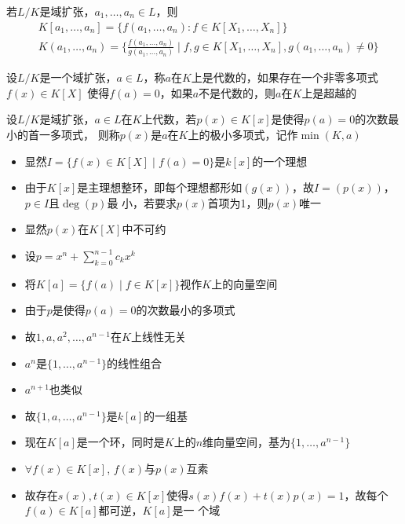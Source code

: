 \documentclass[11pt]{article}
\begin{document}
\begin{proposition}[]
若\(L/K\)是域扩张，\(a_1,\dots,a_n\in L\)，则
\begin{align*}
&K[a_1,\dots,a_n]=\{f(a_1,\dots,a_n):f\in K[X_1,\dots,X_n]\}\\
&K(a_1,\dots,a_n)=\{\frac{f(a_1,\dots,a_n)}{g(a_1,\dots,a_n)}\mid f,g\in K[X_1,\dots,X_n],g(a_1,\dots,a_n)\neq 0\}
\end{align*}
\end{proposition}

\begin{definition}[]
设\(L/K\)是一个域扩张，\(a\in L\)，称\(a\)在\(K\)上是代数的，如果存在一个非零多项式\(f(x)\in K[X]\)
使得\(f(a)=0\)，如果\(a\)不是代数的，则\(a\)在\(K\)上是超越的
\end{definition}

\begin{definition}[]
设\(L/K\)是域扩张，\(a\in L\)在\(K\)上代数，若\(p(x)\in K[x]\)是使得\(p(a)=0\)的次数最小的首一多项式，
则称\(p(x)\)是\(a\)在\(K\)上的极小多项式，记作\(\min(K,a)\)
\end{definition}

\begin{remark}
\begin{itemize}
\item 显然\(I=\{f(x)\in K[X]\mid f(a)=0\}\)是\(k[x]\)的一个理想
\item 由于\(K[x]\)是主理想整环，即每个理想都形如\((g(x))\)，故\(I=(p(x))\)，\(p\in I\)且\(\deg(p)\)最
小，若要求\(p(x)\)首项为1，则\(p(x)\)唯一
\item 显然\(p(x)\)在\(K[X]\)中不可约
\item 设\(p=x^n+\sum_{k=0}^{n-1}c_kx^k\)
\item 将\(K[a]=\{f(a)\mid f\in K[x]\}\)视作\(K\)上的向量空间
\item 由于\(p\)是使得\(p(a)=0\)的次数最小的多项式
\item 故\(1,a,a^2,\dots,a^{n-1}\)在\(K\)上线性无关
\item \(a^n\)是\(\{1,\dots,a^{n-1}\}\)的线性组合
\item \(a^{n+1}\)也类似
\item 故\(\{1,a,\dots,a^{n-1}\}\)是\(k[a]\)的一组基
\item 现在\(K[a]\)是一个环，同时是\(K\)上的\(n\)维向量空间，基为\(\{1,\dots,a^{n-1}\}\)
\item \(\forall f(x)\in K[x]\), \(f(x)\)与\(p(x)\)互素
\item 故存在\(s(x),t(x)\in K[x]\)使得\(s(x)f(x)+t(x)p(x)=1\)，故每个\(f(a)\in K[a]\)都可逆，\(K[a]\)是一
个域
\end{itemize}
\end{remark}
\end{document}
